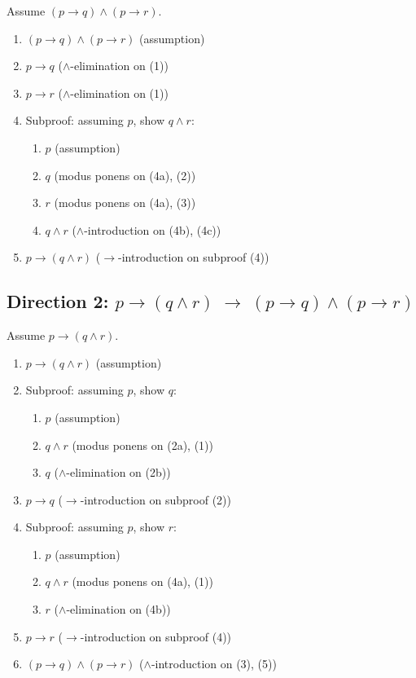 \documentclass[11pt]{article}
\begin{document}
\noindent Assume $(p \to q) \wedge (p \to r)$.
\begin{enumerate}
  \item $(p \to q) \wedge (p \to r)$ \hfill (assumption)
  \item $p \to q$ \hfill ($\wedge$-elimination on (1))
  \item $p \to r$ \hfill ($\wedge$-elimination on (1))
  \item Subproof: assuming $p$, show $q \wedge r$:
    \begin{enumerate}[label=(4\alph*)]
      \item $p$ \hfill (assumption)
      \item $q$ \hfill (modus ponens on (4a), (2))
      \item $r$ \hfill (modus ponens on (4a), (3))
      \item $q \wedge r$ \hfill ($\wedge$-introduction on (4b), (4c))
    \end{enumerate}
  \item $p \to (q \wedge r)$ \hfill ($\to$-introduction on subproof (4))
\end{enumerate}

\subsection*{Direction 2: $p \to (q \wedge r) \;\to\; (p \to q) \wedge (p \to r)$}

\noindent Assume $p \to (q \wedge r)$.
\begin{enumerate}
  \item $p \to (q \wedge r)$ \hfill (assumption)
  \item Subproof: assuming $p$, show $q$:
    \begin{enumerate}[label=(2\alph*)]
      \item $p$ \hfill (assumption)
      \item $q \wedge r$ \hfill (modus ponens on (2a), (1))
      \item $q$ \hfill ($\wedge$-elimination on (2b))
    \end{enumerate}
  \item $p \to q$ \hfill ($\to$-introduction on subproof (2))
  \item Subproof: assuming $p$, show $r$:
    \begin{enumerate}[label=(4\alph*)]
      \item $p$ \hfill (assumption)
      \item $q \wedge r$ \hfill (modus ponens on (4a), (1))
      \item $r$ \hfill ($\wedge$-elimination on (4b))
    \end{enumerate}
  \item $p \to r$ \hfill ($\to$-introduction on subproof (4))
  \item $(p \to q) \wedge (p \to r)$ \hfill ($\wedge$-introduction on (3), (5))
\end{enumerate}
\end{document}
